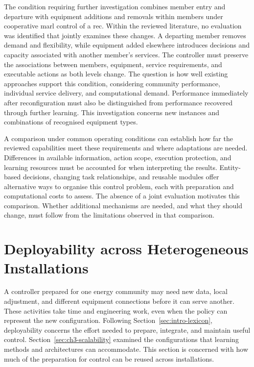 The condition requiring further investigation combines member entry and departure with equipment additions and removals within members under cooperative \gls{marl} control of a \gls{rec}. Within the reviewed literature, no evaluation was identified that jointly examines these changes. A departing member removes demand and flexibility, while equipment added elsewhere introduces decisions and capacity associated with another member's services. The controller must preserve the associations between members, equipment, service requirements, and executable actions as both levels change. The question is how well existing approaches support this condition, considering community performance, individual service delivery, and computational demand. Performance immediately after reconfiguration must also be distinguished from performance recovered through further learning. This investigation concerns new instances and combinations of recognised equipment types.

A comparison under common operating conditions can establish how far the reviewed capabilities meet these requirements and where adaptations are needed. Differences in available information, action scope, execution protection, and learning resources must be accounted for when interpreting the results. Entity-based decisions, changing task relationships, and reusable modules offer alternative ways to organise this control problem, each with preparation and computational costs to assess. The absence of a joint evaluation motivates this comparison. Whether additional mechanisms are needed, and what they should change, must follow from the limitations observed in that comparison.

\FloatBarrier
\section{Deployability across Heterogeneous Installations}
\label{sec:ch3-deployability}

A controller prepared for one energy community may need new data, local adjustment, and different equipment connections before it can serve another. These activities take time and engineering work, even when the policy can represent the new configuration. Following Section~\ref{sec:intro-lexicon}, deployability concerns the effort needed to prepare, integrate, and maintain useful control. Section~\ref{sec:ch3-scalability} examined the configurations that learning methods and architectures can accommodate. This section is concerned with how much of the preparation for control can be reused across installations.

